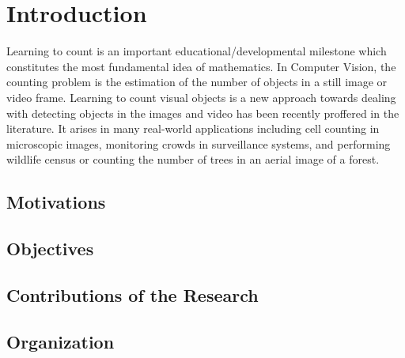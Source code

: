 \chapter{Introduction}
\label{sec:introduction}




Learning to count is an important educational/developmental milestone which constitutes the most fundamental idea of mathematics. In Computer Vision, the counting problem is the estimation of the number of objects in a still image or video frame. Learning to count visual objects is a new approach towards dealing with detecting objects in the images and video has been recently proffered in the literature. It arises in many real-world applications including cell counting in microscopic images, monitoring crowds in surveillance systems, and performing wildlife census or counting the number of trees in an aerial image of a forest\cite{NIPS2010_4043}. 

\section{Motivations}
\section{Objectives}
\section{Contributions of the Research}
\section{Organization}










